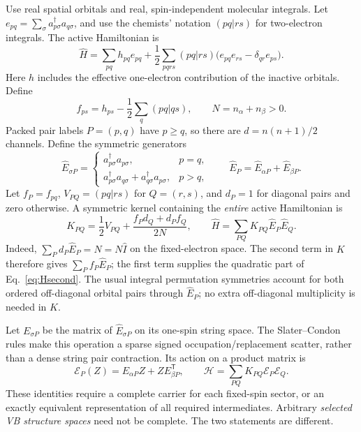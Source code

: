 \documentclass[11pt,a4paper]{article}
\newcommand{\Tr}{^{\mathsf T}}
\newcommand{\Ha}{\mathcal H}
\newcommand{\Ea}{\mathcal E}
\begin{document}
Use real spatial orbitals and real, spin-independent molecular integrals.
Let $e_{pq}=\sum_\sigma a^\dagger_{p\sigma}a_{q\sigma}$, and use the
chemists' notation $(pq|rs)$ for two-electron integrals. The active
Hamiltonian is
\begin{equation}\label{eq:Hsecond}
 \hat H=\sum_{pq}h_{pq}e_{pq}
 +\frac12\sum_{pqrs}(pq|rs)
       \bigl(e_{pq}e_{rs}-\delta_{qr}e_{ps}\bigr).
\end{equation}
Here $h$ includes the effective one-electron contribution of the inactive
orbitals. Define
\begin{equation}
 f_{ps}=h_{ps}-\frac12\sum_q(pq|qs),\qquad
 N=n_\alpha+n_\beta>0.
\end{equation}
Packed pair labels $P=(p,q)$ have $p\ge q$, so there are
$d=n(n+1)/2$ channels. Define the symmetric generators
\begin{equation}
 \hat E_{\sigma P}=\begin{cases}
 a^\dagger_{p\sigma}a_{p\sigma},&p=q,\\
 a^\dagger_{p\sigma}a_{q\sigma}
 +a^\dagger_{q\sigma}a_{p\sigma},&p>q,
 \end{cases}
 \qquad \hat E_P=\hat E_{\alpha P}+\hat E_{\beta P}.
\end{equation}
Let $f_P=f_{pq}$, $V_{PQ}=(pq|rs)$ for $Q=(r,s)$, and $d_P=1$ for
diagonal pairs and zero otherwise. A symmetric kernel containing the
\emph{entire} active Hamiltonian is
\begin{equation}\label{eq:K}
 K_{PQ}=\frac12 V_{PQ}
       +\frac{f_Pd_Q+d_Pf_Q}{2N},\qquad
 \hat H=\sum_{PQ}K_{PQ}\hat E_P\hat E_Q.
\end{equation}
Indeed, $\sum_Pd_P\hat E_P=\hat N=N\hat I$ on the fixed-electron
space. The second term in $K$ therefore gives
$\sum_P f_P\hat E_P$; the first term supplies the quadratic part of
Eq.~\eqref{eq:Hsecond}. The usual integral permutation symmetries account
for both ordered off-diagonal orbital pairs through $\hat E_P$; no extra
off-diagonal multiplicity is needed in $K$.

Let $E_{\sigma P}$ be the matrix of $\hat E_{\sigma P}$ on its
one-spin string space. The Slater--Condon rules make this operation a
sparse signed occupation/replacement scatter, rather than a dense string
pair contraction. Its action on a product matrix is
\begin{equation}
 \Ea_P(Z)=E_{\alpha P}Z+Z E_{\beta P}\Tr,\qquad
 \Ha=\sum_{PQ}K_{PQ}\Ea_P\Ea_Q.
\end{equation}
These identities require a complete carrier for each fixed-spin sector,
or an exactly equivalent representation of all required intermediates.
Arbitrary \emph{selected VB structure spaces} need not be complete.
The two statements are different.
\end{document}
